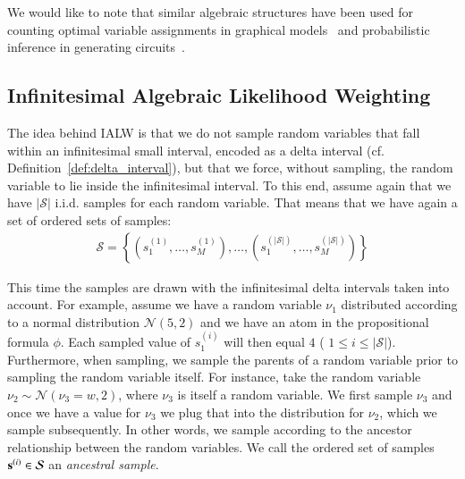 We would like to note that similar algebraic structures have been used for counting optimal variable assignments in graphical models~\citep{marinescu2019counting} and probabilistic inference in generating circuits~\citep{harviainen2023inference}.


\subsection{Infinitesimal Algebraic Likelihood Weighting}
The idea behind IALW is that we do not sample random variables that fall within an infinitesimal small interval, encoded as a delta interval (cf. Definition~\ref{def:delta_interval}), but that we force, without sampling, the random variable to lie inside the infinitesimal interval. 
To this end, assume again that we have $\lvert \mathcal{S} \rvert$ i.i.d. samples for each random variable. That means that we have again a set of ordered sets of samples:
\begin{align}
    \label{eq:ancestral_samples}
    \mathcal{S} = \left\{ \left(s_1^{(1)}, \dots, s_M^{(1)} \right), \dots , \left(s_1^{(\lvert \mathcal{S} \rvert)}, \dots, s_M^{(\lvert \mathcal{S} \rvert)} \right)  \right\}
\end{align}

This time the samples are drawn with the infinitesimal delta intervals taken into account. For example, assume we have a random variable $\nu_1$ distributed according to a normal distribution $\mathcal{N}(5,2)$ and we have an atom  in the propositional formula $\phi$. Each sampled value of $s_1^{(i)}$ will then equal $4$ ( $1\leq i\leq \lvert \mathcal{S} \rvert$). Furthermore, when sampling, we sample the parents of a random variable prior to sampling the random variable itself. For instance, take the random variable $\nu_2\sim \mathcal{N}(\nu_3=w,2)$, where $\nu_3$ is itself a random variable. We first sample $\nu_3$ and once we have a value for $\nu_3$ we plug that into the distribution for $\nu_2$, which we sample subsequently. In other words, we sample according to the ancestor relationship between the random variables.
We call the ordered set of samples $\mathbf{s}^{(i)} \in \mathcal{S}$ an {\em ancestral sample}.




